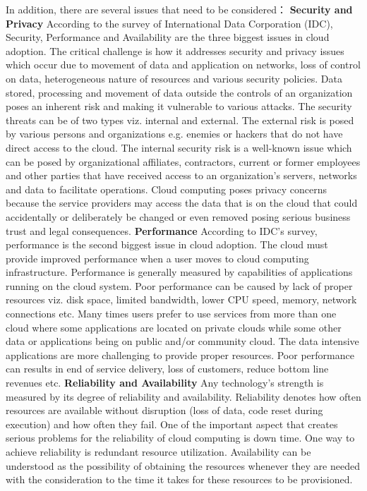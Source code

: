 \documentclass[a4paper,twoside]{scrbook}
\begin{document}
\begin{CJK}{UTF8}{gbsn}
In addition, there are several issues that need to be considered：
\textbf{Security and Privacy}
According to the survey of International Data Corporation (IDC), Security, Performance and Availability are the three biggest issues in cloud adoption. The critical challenge is how it addresses security and privacy issues which occur due to movement of data and application on networks, loss of control on data, heterogeneous nature of resources and various security policies. Data stored, processing and movement of data outside the controls of an organization poses an inherent risk and making it vulnerable to various attacks. The security threats can be of two types viz. internal and external. The external risk is posed by various persons and organizations e.g. enemies or hackers that do not have direct access to the cloud. The internal security risk is a well-known issue which can be posed by organizational affiliates, contractors, current or former employees and other parties that have received access to an organization’s servers, networks and data to facilitate operations. Cloud computing poses privacy concerns because the service providers may access the data that is on the cloud that could accidentally or deliberately be changed or even removed posing serious business trust and legal consequences.
\textbf{Performance}
According to IDC’s survey, performance is the second biggest issue in cloud adoption. The cloud must provide improved performance when a user moves to cloud computing infrastructure. Performance is generally measured by capabilities of applications running on the cloud system. Poor performance can be caused by lack of proper resources viz. disk space, limited bandwidth, lower CPU speed, memory, network connections etc. Many times users prefer to use services from more than one cloud where some applications are located on private clouds while some other data or applications being on public and/or community cloud. The data intensive applications are more challenging to provide proper resources. Poor performance can results in end of service delivery, loss of customers, reduce bottom line revenues etc.
\textbf{Reliability and Availability}
Any technology’s strength is measured by its degree of reliability and availability. Reliability denotes how often resources are available without disruption (loss of data, code reset during execution) and how often they fail. One of the important aspect that creates serious problems for the reliability of cloud computing is down time. One way to achieve reliability is redundant resource utilization. Availability can be understood as the possibility of obtaining the resources whenever they are needed with the consideration to the time it takes for these resources to be provisioned.


\end{CJK}
\end{document}
